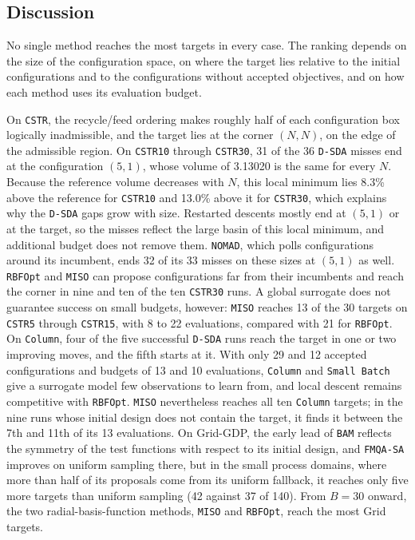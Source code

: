 \documentclass{article}
\begin{document}
\FloatBarrier

\subsection{Discussion}
\label{sec:cross-benchmark}
No single method reaches the most targets in every case.
The ranking depends on the size of the configuration space, on where the target lies relative to the initial configurations and to the configurations without accepted objectives, and on how each method uses its evaluation budget.

On \texttt{CSTR}, the recycle/feed ordering makes roughly half of each configuration box logically inadmissible, and the target lies at the corner \((N,N)\), on the edge of the admissible region.
On \texttt{CSTR10} through \texttt{CSTR30}, 31 of the 36 \texttt{D-SDA} misses end at the configuration \((5,1)\), whose volume of 3.13020 is the same for every \(N\).
Because the reference volume decreases with \(N\), this local minimum lies 8.3\% above the reference for \texttt{CSTR10} and 13.0\% above it for \texttt{CSTR30}, which explains why the \texttt{D-SDA} gaps grow with size.
Restarted descents mostly end at \((5,1)\) or at the target, so the misses reflect the large basin of this local minimum, and additional budget does not remove them.
\texttt{NOMAD}, which polls configurations around its incumbent, ends 32 of its 33 misses on these sizes at \((5,1)\) as well.
\texttt{RBFOpt} and \texttt{MISO} can propose configurations far from their incumbents and reach the corner in nine and ten of the ten \texttt{CSTR30} runs.
A global surrogate does not guarantee success on small budgets, however: \texttt{MISO} reaches 13 of the 30 targets on \texttt{CSTR5} through \texttt{CSTR15}, with 8 to 22 evaluations, compared with 21 for \texttt{RBFOpt}.
On \texttt{Column}, four of the five successful \texttt{D-SDA} runs reach the target in one or two improving moves, and the fifth starts at it.
With only 29 and 12 accepted configurations and budgets of 13 and 10 evaluations, \texttt{Column} and \texttt{Small Batch} give a surrogate model few observations to learn from, and local descent remains competitive with \texttt{RBFOpt}.
\texttt{MISO} nevertheless reaches all ten \texttt{Column} targets; in the nine runs whose initial design does not contain the target, it finds it between the 7th and 11th of its 13 evaluations.
On Grid-GDP, the early lead of \texttt{BAM} reflects the symmetry of the test functions with respect to its initial design, and \texttt{FMQA-SA} improves on uniform sampling there, but in the small process domains, where more than half of its proposals come from its uniform fallback, it reaches only five more targets than uniform sampling (42 against 37 of 140).
From \(B=30\) onward, the two radial-basis-function methods, \texttt{MISO} and \texttt{RBFOpt}, reach the most Grid targets.
\end{document}
